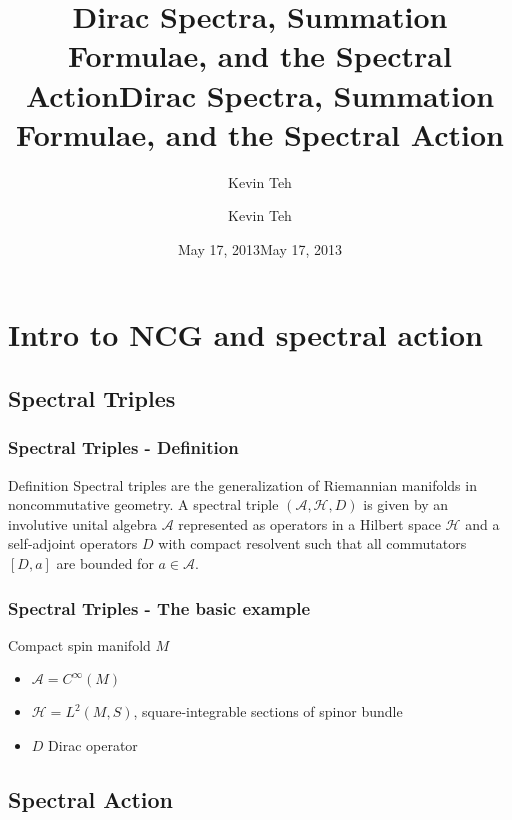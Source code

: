 \documentclass{beamer}
\title{Dirac Spectra, Summation Formulae, and the Spectral Action} \author{Kevin Teh} \date{May 17, 2013}
\title{Dirac Spectra, Summation Formulae, and the Spectral Action}
\author{Kevin Teh}
\institute{Caltech}
\date{May 17, 2013}
\def\cA{{\mathcal A}}
\def\cH{{\mathcal H}}
\begin{document}
\begin{frame}
\titlepage
\end{frame}

\section{Intro to NCG and spectral action}

\subsection{Spectral Triples}
\begin{frame}
  \frametitle{Spectral Triples - Definition}
  \begin{block}{Definition}
    Spectral triples are the generalization of Riemannian manifolds in noncommutative geometry. A spectral triple $(\cA, \cH, D)$ is given by an involutive unital algebra $\cA$ represented as operators in a Hilbert space $\cH$ and a self-adjoint operators $D$ with compact resolvent such that all commutators $[D, a]$ are bounded for $a \in \cA$.
  \end{block}
\end{frame}


\begin{frame}
  \frametitle{Spectral Triples - The basic example}
  \begin{block}{Compact spin manifold $M$}
    \begin{itemize}
      \item $\cA = C^{\infty}(M)$
      \item $\cH = L^2(M, S)$, square-integrable sections of spinor bundle
      \item $D$ Dirac operator
    \end{itemize}
  \end{block}
\end{frame}

\subsection{Spectral Action}
\end{document}
